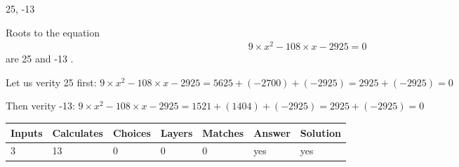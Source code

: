 \documentclass[12pt]{article}
\begin{document}
25,  %
-13
 
 
 
\noindent{}
 
 

 
 
 
\noindent{}
 
 

Roots to the equation
\begin{eqnarray*}
9 \times x^2  %
-108
                 \times x    %
-2925 =0
\end{eqnarray*}
are  %
25 and  %
-13 .
 
Let us verity  %
25 first:
$  %
9 \times x^2  %
-108
                 \times x    %
-2925
  = %
5625+( %
-2700)+( %
-2925)
  = %
2925+( %
-2925)
  = %
0
$
 
Then verity  %
-13:
$  %
9 \times x^2  %
-108
                 \times x    %
-2925
  = %
1521+( %
1404)+( %
-2925)
  = %
2925+( %
-2925)
  = %
0
$
 
 
 
\noindent{}
 
 

 
\vspace{0.3in}
   
   
   
   
\noindent\begin{tabular}{|l|l|l|l|l|l|l|}
 \hline
Inputs & Calculates & Choices & Layers & Matches & Answer & Solution \\ \hline
           3 & 
          13 & 
           0
  & 
           0 & 
           0 & 
  yes & 
  yes 
  \\ \hline
 \end{tabular}
   
   
   
   
\noindent{}
   
   
  
\end{document}

